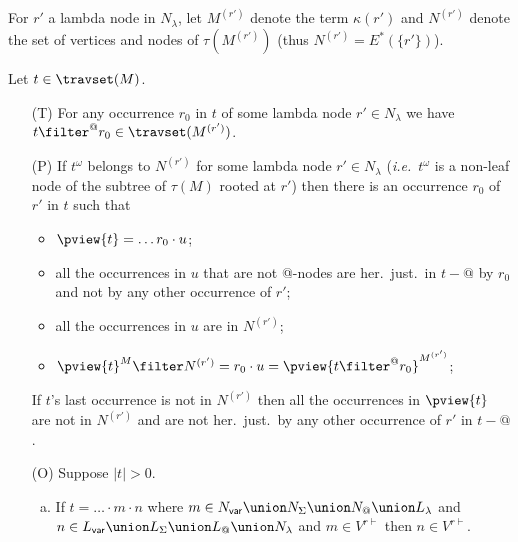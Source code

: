 For $r'$ a lambda node in $N_\lambda$, 
let $M^{(r')}$ denote the term $\kappa(r')$ and $N^{(r')}$ denote the set of vertices and nodes of $\tau(M^{(r')})$
(thus $N^{(r')} = E^*(\{r'\})$).
\begin{proposition}
    \label{prop:trav_filtering} 
    Let $t \in \travset(M)$.
    \begin{itemize}
            \item[(T)] %
            For any occurrence $r_0$ in $t$ of some lambda node $r'\in N_\lambda$ we have
             $t\filter^@ r_0 \in \travset(M^{(r')})$.

            \item[(P)] If $t^\omega$ belongs to $N^{(r')}$ for some lambda node $r'\in N_\lambda$
            ({\it i.e.}\ $t^\omega$ is a non-leaf node of the subtree of $\tau(M)$ rooted at $r'$) then there is an occurrence $r_0$ of $r'$ in $t$ such that
            \begin{itemize}
            \item $\pview{t} = \ldots r_0 \cdot u$;
            \item all the occurrences in $u$ that are not @-nodes are her.\ just.\ in $t-@$ by $r_0$
            and not by any other occurrence of $r'$;
            \item all the occurrences in $u$ are in $N^{(r')}$;
            \item $\pview{t}^M \filter N^{(r')} = r_0\cdot u =  \pview{t\filter^@ r_0}^{M^{(r')}}$;
            \end{itemize}

            If $t$'s last occurrence is not in $N^{(r')}$ then all the occurrences in $\pview{t}$ are not in $N^{(r')}$
            and are not her.\ just.\ by any other occurrence of $r'$ in $t-@$.



        \item[(O)] Suppose $|t|>0$.
            \begin{enumerate}[a.]
            \item If $t= \ldots \cdot m \cdot n$ where
            $m\in N_{\sf var} \union N_\Sigma \union N_@ \union L_\lambda$
            and $n\in L_{\sf var} \union L_\Sigma \union L_@ \union
            N_\lambda$ and $m \in V^{r\vdash}$ then $n \in V^{r\vdash}$.


\end{enumerate}
\end{itemize}
\end{proposition}
